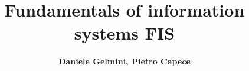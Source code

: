 \documentclass[a4paper,aps,secnumarabic,balancelastpage,amsmath,amssymb,nofootinbib,floatfix]{report}
\begin{document}
\title{\textbf{Fundamentals of information systems FIS}}

\author{\textbf{Daniele Gelmini, Pietro Capece}}
\date{}
\maketitle
\tableofcontents




















\end{document}
